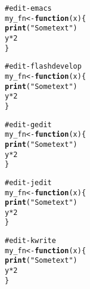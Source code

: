 \documentclass[12pt]{article}\usepackage{graphicx, color}
\makeatletter
\newcommand{\hlfunctioncall}[1]{\textcolor[rgb]{0.188235294117647,0.650980392156863,0.188235294117647}{\textbf{#1}}}%
\newcommand{\hlstring}[1]{\textcolor[rgb]{0.850980392156863,1,0.466666666666667}{#1}}%
\newcommand{\hlcomment}[1]{\textcolor[rgb]{0.533333333333333,0.533333333333333,0.533333333333333}{#1}}%
\newenvironment{kframe}{%
 \def\at@end@of@kframe{}%
 \ifinner\ifhmode%
  \def\at@end@of@kframe{\end{minipage}}%
  \begin{minipage}{\columnwidth}%
 \fi\fi%
 \def\FrameCommand##1{\hskip\@totalleftmargin \hskip-\fboxsep
 \colorbox{shadecolor}{##1}\hskip-\fboxsep
     \hskip-\linewidth \hskip-\@totalleftmargin \hskip\columnwidth}%
 \MakeFramed {\advance\hsize-\width
   \@totalleftmargin\z@ \linewidth\hsize
   \@setminipage}}%
 {\par\unskip\endMakeFramed%
 \at@end@of@kframe}
\newenvironment{knitrout}{}{} %
\makeatother
\begin{document}
\begin{knitrout}
\color{fgcolor}\begin{kframe}
\begin{alltt}
\hlcomment{# edit-emacs}
my_fn <- \hlfunctioncall{function}(x) \{
    \hlfunctioncall{print}(\hlstring{"Some text"})
    y * 2
\}
\end{alltt}
\end{kframe}
\end{knitrout}





\begin{knitrout}
\color{fgcolor}\begin{kframe}
\begin{alltt}
\hlcomment{# edit-flashdevelop}
my_fn <- \hlfunctioncall{function}(x) \{
    \hlfunctioncall{print}(\hlstring{"Some text"})
    y * 2
\}
\end{alltt}
\end{kframe}
\end{knitrout}





\begin{knitrout}
\color{fgcolor}\begin{kframe}
\begin{alltt}
\hlcomment{# edit-gedit}
my_fn <- \hlfunctioncall{function}(x) \{
    \hlfunctioncall{print}(\hlstring{"Some text"})
    y * 2
\}
\end{alltt}
\end{kframe}
\end{knitrout}





\begin{knitrout}
\color{fgcolor}\begin{kframe}
\begin{alltt}
\hlcomment{# edit-jedit}
my_fn <- \hlfunctioncall{function}(x) \{
    \hlfunctioncall{print}(\hlstring{"Some text"})
    y * 2
\}
\end{alltt}
\end{kframe}
\end{knitrout}





\begin{knitrout}
\color{fgcolor}\begin{kframe}
\begin{alltt}
\hlcomment{# edit-kwrite}
my_fn <- \hlfunctioncall{function}(x) \{
    \hlfunctioncall{print}(\hlstring{"Some text"})
    y * 2
\}
\end{alltt}
\end{kframe}
\end{knitrout}
\end{document}
